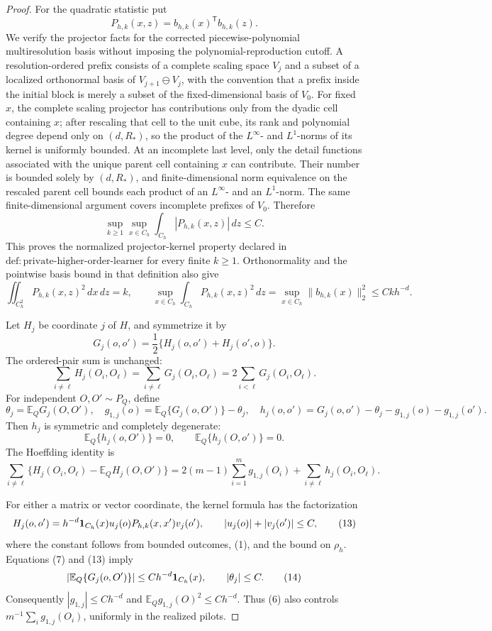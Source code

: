 \documentclass{article}
\begin{document}
\begin{proof}
For the quadratic statistic put
\[
 P_{h,k}(x,z)=b_{h,k}(x)^{\mathsf T}b_{h,k}(z).
\]
We verify the projector facts for the corrected piecewise-polynomial multiresolution basis without imposing the polynomial-reproduction cutoff.  A resolution-ordered prefix consists of a complete scaling space \(V_j\) and a subset of a localized orthonormal basis of \(V_{j+1}\ominus V_j\), with the convention that a prefix inside the initial block is merely a subset of the fixed-dimensional basis of \(V_0\).  For fixed \(x\), the complete scaling projector has contributions only from the dyadic cell containing \(x\); after rescaling that cell to the unit cube, its rank and polynomial degree depend only on \((d,R_*)\), so the product of the \(L^\infty\)- and \(L^1\)-norms of its kernel is uniformly bounded.  At an incomplete last level, only the detail functions associated with the unique parent cell containing \(x\) can contribute.  Their number is bounded solely by \((d,R_*)\), and finite-dimensional norm equivalence on the rescaled parent cell bounds each product of an \(L^\infty\)- and an \(L^1\)-norm.  The same finite-dimensional argument covers incomplete prefixes of \(V_0\).  Therefore
\[
 \sup_{k\ge1}\sup_{x\in C_h}
 \int_{C_h}|P_{h,k}(x,z)|\,dz\leq C.
\tag{7}
\]
This proves the normalized projector-kernel property declared in \(\mathrm{def{:}private\text{-}higher\text{-}order\text{-}learner}\) for every finite \(k\ge1\).  Orthonormality and the pointwise basis bound in that definition also give
\[
 \iint_{C_h^2}P_{h,k}(x,z)^2\,dx\,dz=k,
 \qquad
 \sup_{x\in C_h}\int_{C_h}P_{h,k}(x,z)^2\,dz
 =\sup_{x\in C_h}\|b_{h,k}(x)\|_2^2
 \leq Ckh^{-d}.
\tag{8}
\]

Let \(H_j\) be coordinate \(j\) of \(H\), and symmetrize it by
\[
 G_j(o,o')=\frac12\{H_j(o,o')+H_j(o',o)\}.
\]
The ordered-pair sum is unchanged:
\[
 \sum_{i\ne \ell}H_j(O_i,O_\ell)
 =\sum_{i\ne \ell}G_j(O_i,O_\ell)
 =2\sum_{i<\ell}G_j(O_i,O_\ell).
\tag{9}
\]
For independent \(O,O'\sim P_Q\), define
\[
 \theta_j=\mathbb E_QG_j(O,O'),
 \quad g_{1,j}(o)=\mathbb E_Q\{G_j(o,O')\}-\theta_j,
 \quad h_j(o,o')=G_j(o,o')-\theta_j-g_{1,j}(o)-g_{1,j}(o').
\tag{10}
\]
Then \(h_j\) is symmetric and completely degenerate:
\[
 \mathbb E_Q\{h_j(o,O')\}=0,
 \qquad
 \mathbb E_Q\{h_j(O,o')\}=0.
\tag{11}
\]
The Hoeffding identity is
\[
 \sum_{i\ne\ell}\{H_j(O_i,O_\ell)-\mathbb E_QH_j(O,O')\}
 =2(m-1)\sum_{i=1}^m g_{1,j}(O_i)
  +\sum_{i\ne\ell}h_j(O_i,O_\ell).
\tag{12}
\]

For either a matrix or vector coordinate, the kernel formula has the factorization
\[
 H_j(o,o')=h^{-d}{\bf1}_{C_h}(x)u_j(o)
             P_{h,k}(x,x')v_j(o'),
 \qquad |u_j(o)|+|v_j(o')|\leq C,
\tag{13}
\]
where the constant follows from bounded outcomes, (1), and the bound on \(\rho_h\).  Equations (7) and (13) imply
\[
 |\mathbb E_Q\{G_j(o,O')\}|\le Ch^{-d}{\bf1}_{C_h}(x),
 \qquad |\theta_j|\le C.
\tag{14}
\]
Consequently \(|g_{1,j}|\le Ch^{-d}\) and \(\mathbb E_Qg_{1,j}(O)^2\le Ch^{-d}\).  Thus (6) also controls \(m^{-1}\sum_i g_{1,j}(O_i)\), uniformly in the realized pilots.


\end{proof}
\end{document}
